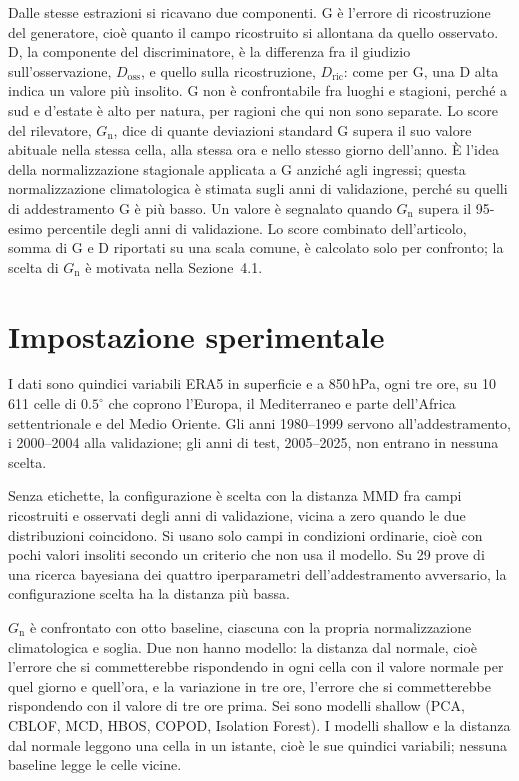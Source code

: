 \documentclass[11pt,a4paper]{article}
\begin{document}
Dalle stesse estrazioni si ricavano due componenti. G è l'errore di ricostruzione del generatore, cioè quanto il campo ricostruito si allontana da quello osservato. D, la componente del discriminatore, è la differenza fra il giudizio sull'osservazione, $D_{\mathrm{oss}}$, e quello sulla ricostruzione, $D_{\mathrm{ric}}$: come per G, una D alta indica un valore più insolito. G non è confrontabile fra luoghi e stagioni, perché a sud e d'estate è alto per natura, per ragioni che qui non sono separate. Lo score del rilevatore, $G_{\mathrm{n}}$, dice di quante deviazioni standard G supera il suo valore abituale nella stessa cella, alla stessa ora e nello stesso giorno dell'anno. È l'idea della normalizzazione stagionale applicata a G anziché agli ingressi; questa normalizzazione climatologica è stimata sugli anni di validazione, perché su quelli di addestramento G è più basso. Un valore è segnalato quando $G_{\mathrm{n}}$ supera il 95-esimo percentile degli anni di validazione. Lo score combinato dell'articolo, somma di G e D riportati su una scala comune, è calcolato solo per confronto; la scelta di $G_{\mathrm{n}}$ è motivata nella Sezione~4.1.

\section{Impostazione sperimentale}

I dati sono quindici variabili ERA5 in superficie e a 850\,hPa, ogni tre ore, su 10\,611 celle di $0.5^\circ$ che coprono l'Europa, il Mediterraneo e parte dell'Africa settentrionale e del Medio Oriente. Gli anni 1980--1999 servono all'addestramento, i 2000--2004 alla validazione; gli anni di test, 2005--2025, non entrano in nessuna scelta.

Senza etichette, la configurazione è scelta con la distanza MMD fra campi ricostruiti e osservati degli anni di validazione, vicina a zero quando le due distribuzioni coincidono. Si usano solo campi in condizioni ordinarie, cioè con pochi valori insoliti secondo un criterio che non usa il modello. Su 29 prove di una ricerca bayesiana dei quattro iperparametri dell'addestramento avversario, la configurazione scelta ha la distanza più bassa.

$G_{\mathrm{n}}$ è confrontato con otto baseline, ciascuna con la propria normalizzazione climatologica e soglia. Due non hanno modello: la distanza dal normale, cioè l'errore che si commetterebbe rispondendo in ogni cella con il valore normale per quel giorno e quell'ora, e la variazione in tre ore, l'errore che si commetterebbe rispondendo con il valore di tre ore prima. Sei sono modelli shallow (PCA, CBLOF, MCD, HBOS, COPOD, Isolation Forest). I modelli shallow e la distanza dal normale leggono una cella in un istante, cioè le sue quindici variabili; nessuna baseline legge le celle vicine.
\end{document}
